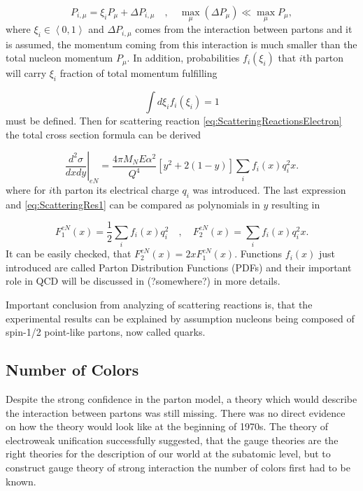 \begin{equation}
  P_{i,\mu} = \xi_i P_\mu + \Delta P_{i,\mu} 
    \quad , \quad \max_\mu (\Delta P_\mu) \ll \max_\mu P_\mu,
  \label{PartonsMomentumDistriburtionAssumption}
\end{equation}
where $\xi_i \in \left< 0, 1 \right>$ and $\Delta P_{i,\mu}$ comes from the
interaction between partons and it is assumed, the momentum coming from this
interaction is much smaller than the total nucleon momentum $P_\mu$. In
addition, probabilities $f_i(\xi_i)$ that $i$th parton will carry $\xi_i$
fraction of total momentum fulfilling

\begin{equation}
  \int d\xi_i f_i(\xi_i) = 1
  \label{eq:PartonDensityFunctionsNormalization}
\end{equation}
must be defined. Then for scattering reaction
\eqref{eq:ScatteringReactionsElectron} the total cross section
formula can be derived

\begin{equation}
  \left. \frac{d^2\sigma}{dxdy} \right|_{eN} =
  \frac{4 \pi M_N E \alpha^2}{Q^4} \left[ y^2 + 2 ( 1 - y ) \right]
  \sum_i f_i(x) q_i^2 x.
  \label{eg:ScatteringRes2}
\end{equation}
where for $i$th parton its electrical charge $q_i$ was introduced. The last
expression and \eqref{eq:ScatteringRes1} can be compared as polynomials in $y$
resulting in

\begin{equation}
  F_1^{eN}(x) = \frac{1}{2} \sum_i f_i(x)q_i^2
  \quad , \quad
  F_2^{eN}(x) = \sum_i f_i(x) q_i^2 x.
  \label{eq:StructureFunctionAndPDF}
\end{equation}
It can be easily checked, that $F_2^{eN}(x) = 2 x F_1^{eN}(x)$. Functions
$f_i(x)$ just introduced are called Parton Distribution Functions (PDFs) and their
important role in QCD will be discussed in (?somewhere?) in more details.

Important conclusion from analyzing of scattering reactions is, that the
experimental results can be explained by assumption nucleons being composed of
spin-1/2 point-like partons, now called quarks. 

\subsection{Number of Colors}

Despite the strong confidence in the parton model, a theory which would describe the
interaction between partons was still missing. There was no direct evidence on
how the theory would look like at the beginning of 1970s. The theory of electroweak
unification successfully suggested, that the gauge theories are the right
theories for the description of our world at the subatomic level, but to construct gauge
theory of strong interaction the number of colors first had to be known.

